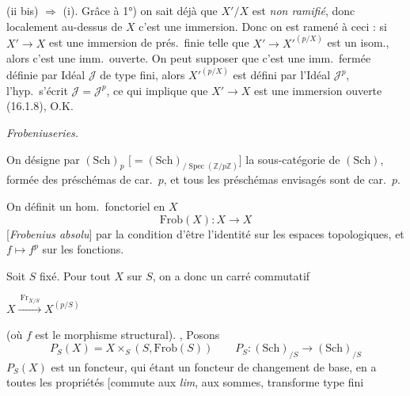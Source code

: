 \documentclass[11pt,a4paper]{article}
\begin{document}
(ii bis) $\Longrightarrow$ (i). Grâce à 1°) on sait déjà que $X'/X$ est
\emph{non ramifié}, donc localement  au-dessus de $X$
\struck{\ill{}} c'est une immersion. Donc on est ramené à ceci : si
$X' \to X$ est une immersion de prés.\ finie telle que $X' \to X'^{(p/X)}$
est un isom., alors c'est une imm.\ ouverte. On peut supposer que c'est une
imm.\ fermée définie par Idéal $\mathcal{J}$ de type fini, alors $X'^{(p/X)}$
est défini par l'Idéal $\mathcal{J}^{p}$, l'hyp.\ s'écrit
$\mathcal{J} = \mathcal{J}^{p}$, ce qui implique que \struck{\ill{}}
$X' \to X$ est une immersion ouverte (16.1.8), O.K.


\emph{Frobeniuseries.}


On désigne par $(\mathrm{Sch})_p$
$\bigl[= (\mathrm{Sch})_{/\operatorname{Spec}(\mathbb{Z}/p\mathbb{Z})}\bigr]$
la sous-catégorie  de $(\mathrm{Sch})$, formée des préschémas
de car.\ $p$, et tous les préschémas envisagés sont de car.\ $p$.

On définit un hom.\ fonctoriel en $X$
\[
  \mathrm{Frob}(X) : X \longrightarrow X
\]
[\emph{Frobenius absolu}] par la condition d'être l'identité sur les espaces
topologiques, et $f \mapsto f^p$ sur les fonctions.

Soit $S$ fixé. Pour tout $X$ sur $S$, on a donc un carré commutatif


\qquad $X \xrightarrow{\ \mathrm{Fr}_{X/S}\ } X^{(p/S)}$

(où $f$ est le morphisme structural). , Posons
\[
  P_S(X) = X \times_S (S, \mathrm{Frob}(S)) \qquad
  P_S : (\mathrm{Sch})_{/S} \longrightarrow (\mathrm{Sch})_{/S}
\]
$P_S(X)$ est un foncteur, qui étant un foncteur de changement de
base, en a toutes les propriétés [commute aux \emph{lim}, aux sommes,
transforme type fini

\end{document}
